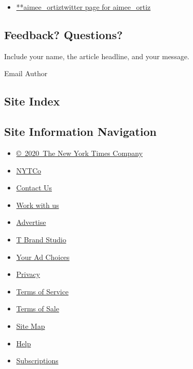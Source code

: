\begin{itemize}
\tightlist
\item
  \href{https://twitter.com/aimee_ortiz}{**aimee\_ortiztwitter page for
  aimee\_ortiz}
\end{itemize}

\hypertarget{feedback-questions}{%
\subsection{Feedback? Questions?}\label{feedback-questions}}

Include your name, the article headline, and your message.

Email Author

\hypertarget{site-index}{%
\subsection{Site Index}\label{site-index}}

\hypertarget{site-information-navigation}{%
\subsection{Site Information
Navigation}\label{site-information-navigation}}

\begin{itemize}
\tightlist
\item
  \href{https://help.nytimes.com/hc/en-us/articles/115014792127-Copyright-notice}{©~2020~The
  New York Times Company}
\end{itemize}

\begin{itemize}
\tightlist
\item
  \href{https://www.nytco.com/}{NYTCo}
\item
  \href{https://help.nytimes.com/hc/en-us/articles/115015385887-Contact-Us}{Contact
  Us}
\item
  \href{https://www.nytco.com/careers/}{Work with us}
\item
  \href{https://nytmediakit.com/}{Advertise}
\item
  \href{http://www.tbrandstudio.com/}{T Brand Studio}
\item
  \href{https://www.nytimes.com/privacy/cookie-policy\#how-do-i-manage-trackers}{Your
  Ad Choices}
\item
  \href{https://www.nytimes.com/privacy}{Privacy}
\item
  \href{https://help.nytimes.com/hc/en-us/articles/115014893428-Terms-of-service}{Terms
  of Service}
\item
  \href{https://help.nytimes.com/hc/en-us/articles/115014893968-Terms-of-sale}{Terms
  of Sale}
\item
  \href{https://spiderbites.nytimes.com}{Site Map}
\item
  \href{https://help.nytimes.com/hc/en-us}{Help}
\item
  \href{https://www.nytimes.com/subscription?campaignId=37WXW}{Subscriptions}
\end{itemize}
